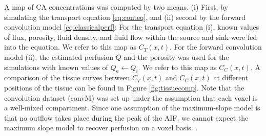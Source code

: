 \documentclass[paper=a4, fontsize=11pt,parskip=half,headings=small]{scrartcl}
\newcommand{\Perf}{Q}
\begin{document}
	A map of CA concentrations was computed by two means. (i) First, by simulating the transport equation \eqref{eq:conteq}, and (ii) second by the forward convolution model \eqref{eq:classicalperf}: For the transport equation (i), known values of flux, porosity, fluid density, and fluid flow within the source and sink were fed into the equation. We refer to this map as $C_T(x,t)$. For the forward convolution model (ii), the estimated perfusion $\Perf$ and the porosity was used for the simulations with known values of $\Perf_a \leftarrow \Perf_i$. We refer to this map as $C_C(x,t)$. 
	A comparison of the tissue curves between $C_T(x,t)$ and $C_C(x,t)$ at different positions of the tissue can be found in Figure \ref{fig:tissuecomp}. 
	Note that the convolution dataset (convM) was set up under the assumption that each voxel is a well-mixed compartment.
	Since one assumption of the maximum-slope model is that no outflow takes place during the peak of the AIF, we cannot expect the maximum slope model to recover perfusion on a voxel basis.
	.
\end{document}
